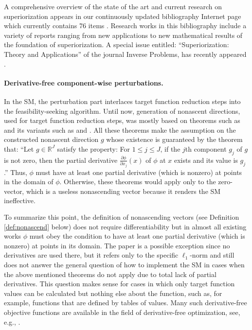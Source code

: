 \documentclass[smallextended]{svjour3}      %
\begin{document}
A comprehensive overview of the state of the art and current research on superiorization appears in our continuously updated bibliography Internet page which currently contains 76 items \cite{sup-bib}. Research works in this bibliography include a variety of reports ranging from new applications to new mathematical results of the foundation of superiorization. A special issue entitled: \textquotedblleft Superiorization: Theory and Applications\textquotedblright{} of the journal Inverse Problems, has recently appeared \cite{Sup-Special-Issue-2017}.

\paragraph{\textbf{Derivative-free component-wise perturbations}.}
In the SM, the perturbation part interlaces target function reduction steps into the feasibility-seeking algorithm. Until now, generation of nonascent directions, used for target function reduction steps, was mostly based on theorems such as \cite[Theorem 1]{herman2012superiorization} and its variants such as \cite[Theorem 1]{garduno2014} and \cite[unnumbered Theorem on page 7]{garduno2017}. All these theorems make the assumption on the constructed nonascent direction $g$ whose existence is guaranteed by the theorem that: ``Let $g\in \mathbb{R}^{J}$ satisfy the property: For $1\leq j\leq J$, if the $j$th component $g_{j}$ of $g$ is not zero, then the partial derivative $\frac{\partial\phi}{\partial x_{j}}(x)$ of $\phi$ at $x$ exists and its value is $g_{j}$.'' Thus, $\phi$ must have at least one partial derivative (which is nonzero) at points in the domain of $\phi$. Otherwise, these theorems would apply only to the zero-vector, which is a useless nonascending vector because it renders the SM ineffective.

To summarize this point, the definition of nonascending vectors (see Definition \ref{def:nonascend} below) does not require differentiability but in almost all existing works $\phi$ must obey the condition to have at least one partial derivative (which is nonzero) at points in its domain.
The paper \cite{garduno2011} is a possible exception since no derivatives are used there, but it refers only to the specific $\ell_{1}$-norm and still does not answer the general question of how to implement the SM in cases when the above mentioned theorems do not apply due to total lack of partial derivatives. This question makes sense for cases in which only target function values can be calculated but nothing else about the function, such as, for example, functions that are defined by tables of values. Many such derivative-free objective functions are available in the field of derivative-free optimization, see, e.g., \cite{rios2013}.
\end{document}
